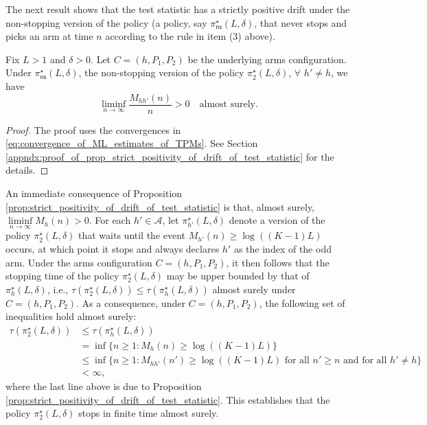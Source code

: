 The next result shows that the test statistic has a strictly positive drift under the non-stopping version of the policy (a policy, say $\pi_{\textsf{ns}}^\star(L, \delta)$, that never stops and picks an arm at time $n$ according to the rule in item (3) above).
\begin{prop}\label{prop:strict_positivity_of_drift_of_test_statistic}
	Fix $L > 1$ and $\delta>0$. Let $C=(h, P_1, P_2)$ be the underlying arms configuration. Under $\pi_{\textsf{ns}}^\star(L, \delta)$,  the non-stopping version of the policy $\pi_2^\star(L,\delta)$, $\forall$ $h'\neq h$, we have
	\begin{equation}
		\liminf\limits_{n \to \infty} \frac{M_{hh'}(n)}{n}>0 \quad \text{almost surely}.
		\label{eq:test_statistic_has_strictly_positive_drift}
	\end{equation}
\end{prop}
\begin{proof}
The proof uses the convergences in \eqref{eq:convergence_of_ML_estimates_of_TPMs}. See Section \ref{appndx:proof_of_prop_strict_positivity_of_drift_of_test_statistic} for the details.	
\end{proof}
An immediate consequence of Proposition \ref{prop:strict_positivity_of_drift_of_test_statistic} is that, almost surely, $\liminf\limits_{n\to\infty} M_h(n)>0$. For each $h'\in \mathcal{A}$, let $\pi^\star_{h'}(L,\delta)$ denote a version of the policy $\pi_2^\star(L, \delta)$ that waits until the event $M_{h'}(n)\geq \log((K-1)L)$ occurs, at which point it stops and always declares $h'$ as the index of the odd arm. Under the arms configuration $C=(h, P_1, P_2)$, it then follows that the stopping time of the policy $\pi_2^\star(L,\delta)$ may be upper bounded by that of $\pi^\star_h(L,\delta)$, i.e., $\tau(\pi_2^\star(L,\delta)) \leq \tau(\pi^\star_h(L,\delta))$ almost surely under $C=(h, P_1, P_2)$. As a consequence, under $C=(h, P_1, P_2)$, the following set of inequalities hold almost surely:
\begingroup\allowdisplaybreaks
\begin{align}
	\tau(\pi_2^\star(L,\delta)) &\leq \tau(\pi^\star_h(L,\delta))\nonumber\\
	&=\inf\{n\geq 1:M_h(n)\geq \log((K-1)L)\}\nonumber\\
	&\leq \inf\bigg\lbrace n\geq 1:M_{hh'}(n')\geq \log((K-1)L)\text{ for all }n'\geq n\text{ and for all }h'\neq h\bigg\rbrace\nonumber\\
	&<\infty,\label{eq:stopping_time_finite_almost_surely}
\end{align}\endgroup
where the last line above is due to Proposition \ref{prop:strict_positivity_of_drift_of_test_statistic}. This establishes that the policy $\pi_2^\star(L,\delta)$ stops in finite time almost surely.

